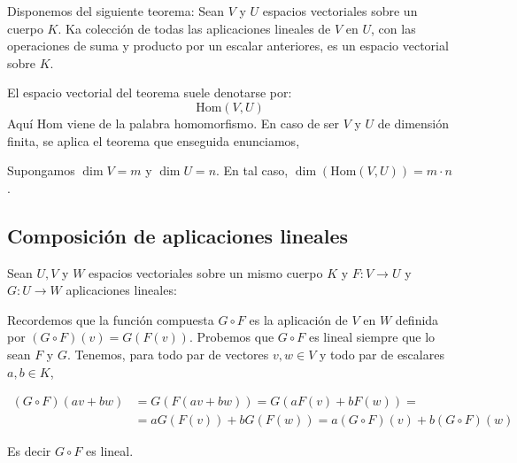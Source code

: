 Disponemos del siguiente teorema:
\teorema Sean \(V\) y \(U\) espacios vectoriales sobre un cuerpo \(K\). Ka colección de todas las aplicaciones lineales de \(V\) en \(U\), con las operaciones de suma y producto por un escalar anteriores, es un espacio vectorial sobre \(K\).

El espacio vectorial del teorema suele denotarse por:
\[
\text{Hom}(V,U)
\]
Aquí \(\text{Hom}\) viene de la palabra homomorfismo. En caso de ser \(V\) y \(U\) de dimensión finita, se aplica el teorema que enseguida enunciamos,

Supongamos \(\dim V = m\) y \(\dim U=n\). En tal caso, \(\dim(\text{Hom}(V,U)) = m\cdot n\).

\subsection{Composición de aplicaciones lineales}

Sean \(U, V\) y \(W\) espacios vectoriales sobre un mismo cuerpo \(K\) y \(F : V \rightarrow U\) y \(G: U \rightarrow W\) aplicaciones lineales:
\begin{center}
\end{center}

Recordemos que la función compuesta \(G \circ F\) es la aplicación de \(V\) en \(W\) definida por \((G \circ F) (v) = G(F(v))\). Probemos que \(G\circ F\) es lineal siempre que lo sean \(F\) y \(G\). Tenemos, para todo par de vectores \(v,w \in V\) y todo par de escalares \(a,b \in K\),

\begin{align*}
  (G \circ F)(av + bw) &= G(F(av+bw)) = G(aF(v)+bF(w)) =\\
  &=aG(F(v)) + bG(F(w)) = a(G \circ F)(v) + b(G \circ F)(w)  
\end{align*}

Es decir \(G \circ F\) es lineal.

